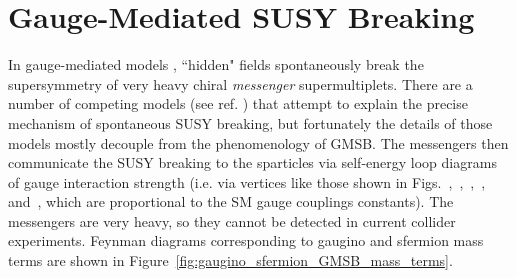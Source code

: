 \documentclass[dissertation.tex]{subfiles}
\begin{document}
\section{Gauge-Mediated SUSY Breaking}
\label{sec:Gauge-Mediated SUSY Breaking}

In gauge-mediated models \cite{GMSB}, ``hidden" fields spontaneously break the supersymmetry of very heavy chiral \textit{messenger} supermultiplets.  There are a number of competing models (see ref. \cite{GMSB}) that attempt to explain the precise mechanism of spontaneous SUSY breaking, but fortunately the details of those models mostly decouple from the phenomenology of GMSB.  The messengers then communicate the SUSY breaking to the sparticles via self-energy loop diagrams of gauge interaction strength (i.e. via vertices like those shown in Figs.~,~,~,~, and~, which are proportional to the SM gauge couplings constants).  The messengers are very heavy, so they cannot be detected in current collider experiments.  Feynman diagrams corresponding to gaugino and sfermion mass terms are shown in Figure~\ref{fig:gaugino_sfermion_GMSB_mass_terms}.
\end{document}
